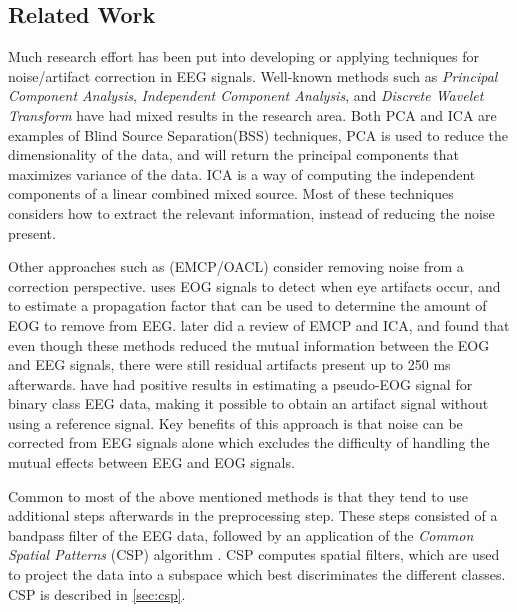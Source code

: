 \subsection{Related Work}
Much research effort has been put into developing or applying techniques for noise/artifact correction in EEG signals. Well-known methods such as \emph{Principal Component Analysis}, \emph{Independent Component Analysis}, and \emph{Discrete Wavelet Transform} have had mixed results in the research area. Both PCA and ICA are examples of Blind Source Separation(BSS) techniques, PCA is used to reduce the dimensionality of the data, and will return the principal components that maximizes variance of the data. ICA is a way of computing the independent components of a linear combined mixed source.    Most of these techniques considers how to extract the relevant information, instead of reducing the noise present.

Other approaches such as (EMCP/OACL) consider removing noise from a correction perspective. \cite{gratton1983new} uses EOG signals to detect when eye artifacts occur, and to estimate a propagation factor that can be used to determine the amount of EOG to remove from EEG. \cite{hoffmann2008correction} later did a review of EMCP and ICA, and found that even though these methods reduced the mutual information between the EOG and EEG signals, there were still residual artifacts present up to 250 ms afterwards. \cite{li2015ocular} have had positive results in estimating a pseudo-EOG signal for binary class EEG data, making it possible to obtain an artifact signal without using a reference signal. Key benefits of this approach is that noise can be corrected from EEG signals alone which excludes the difficulty of handling the mutual effects between EEG and EOG signals.

Common to most of the above mentioned methods is that they tend to use additional steps afterwards in the preprocessing step. These steps consisted of a bandpass filter of the EEG data, followed by an application of the \emph{Common Spatial Patterns} (CSP) algorithm \citep{ramoser2000optimal}. CSP computes spatial filters, which are used to project the data into a subspace which best discriminates the different classes. CSP is described in \cref{sec:csp}.
